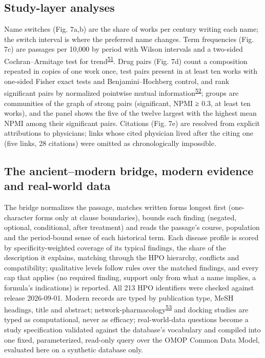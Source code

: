 \documentclass[
]{article}
\begin{document}
\hypertarget{study-layer-analyses}{%
\subsection{Study-layer analyses}\label{study-layer-analyses}}

Name switches (Fig. 7a,b) are the share of works per century writing
each name; the switch interval is where the preferred name changes. Term
frequencies (Fig. 7c) are passages per 10,000 by period with Wilson
intervals and a two-sided Cochran--Armitage test for
trend\textsuperscript{\protect\hyperlink{ref-armitage1955tests}{51}}.
Drug pairs (Fig. 7d) count a composition repeated in copies of one work
once, test pairs present in at least ten works with one-sided Fisher
exact tests and Benjamini--Hochberg control, and rank significant pairs
by normalized pointwise mutual
information\textsuperscript{\protect\hyperlink{ref-bouma2009npmi}{52}};
groups are communities of the graph of strong pairs (significant, NPMI ≥
0.3, at least ten works), and the panel shows the five of the twelve
largest with the highest mean NPMI among their significant pairs.
Citations (Fig. 7e) are resolved from explicit attributions to
physicians; links whose cited physician lived after the citing one (five
links, 28 citations) were omitted as chronologically impossible.

\hypertarget{the-ancientmodern-bridge-modern-evidence-and-real-world-data}{%
\subsection{The ancient--modern bridge, modern evidence and real-world
data}\label{the-ancientmodern-bridge-modern-evidence-and-real-world-data}}

The bridge normalizes the passage, matches written forms longest first
(one-character forms only at clause boundaries), bounds each finding
(negated, optional, conditional, after treatment) and reads the
passage's course, population and the period-bound sense of each
historical term. Each disease profile is scored by specificity-weighted
coverage of its typical findings, the share of the description it
explains, matching through the HPO hierarchy, conflicts and
compatibility; qualitative levels follow rules over the matched
findings, and every cap that applies (no required finding, support only
from what a name implies, a formula's indications) is reported. All 213
HPO identifiers were checked against release 2026-09-01. Modern records
are typed by publication type, MeSH headings, title and abstract;
network-pharmacology\textsuperscript{\protect\hyperlink{ref-hopkins2008network}{53}}
and docking studies are typed as computational, never as efficacy;
real-world-data questions become a study specification validated against
the database's vocabulary and compiled into one fixed, parameterized,
read-only query over the OMOP Common Data Model, evaluated here on a
synthetic database only.
\end{document}
